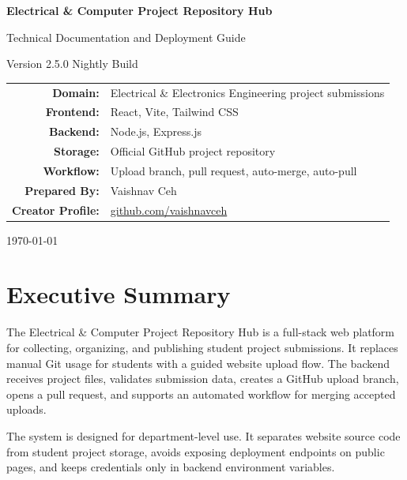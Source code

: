\documentclass[12pt,a4paper]{article}
\begin{document}
\begin{titlepage}
    \centering
    \vspace*{1.4cm}
    {\Huge\bfseries Electrical \& Computer Project Repository Hub\par}
    \vspace{0.35cm}
    {\Large Technical Documentation and Deployment Guide\par}
    \vspace{0.8cm}
    {\large Version 2.5.0 Nightly Build\par}
    \vfill
    \begin{tabular}{rl}
        \textbf{Domain:} & Electrical \& Electronics Engineering project submissions \\
        \textbf{Frontend:} & React, Vite, Tailwind CSS \\
        \textbf{Backend:} & Node.js, Express.js \\
        \textbf{Storage:} & Official GitHub project repository \\
        \textbf{Workflow:} & Upload branch, pull request, auto-merge, auto-pull \\
        \textbf{Prepared By:} & Vaishnav Ceh \\
        \textbf{Creator Profile:} & \href{https://github.com/vaishnavceh}{github.com/vaishnavceh} \\
    \end{tabular}
    \vfill
    {\large \today\par}
\end{titlepage}

\tableofcontents
\newpage

\section{Executive Summary}

The Electrical \& Computer Project Repository Hub is a full-stack web platform for collecting, organizing, and publishing student project submissions. It replaces manual Git usage for students with a guided website upload flow. The backend receives project files, validates submission data, creates a GitHub upload branch, opens a pull request, and supports an automated workflow for merging accepted uploads.

The system is designed for department-level use. It separates website source code from student project storage, avoids exposing deployment endpoints on public pages, and keeps credentials only in backend environment variables.
\end{document}
